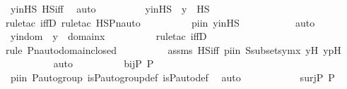 \begin{isabellebody}
\ yinHS\ HS{\isacharunderscore}{\kern0pt}iff\ \isamarkupfalse%
\ auto\isanewline
\ \ \ \ \ \ \isamarkupfalse%
\ \isamarkupfalse%
\ y{\isacharprime}{\kern0pt}inHS\ {\isacharcolon}{\kern0pt}\ {\isachardoublequoteopen}y{\isacharprime}{\kern0pt}\ {\isasymin}\ HS{\isachardoublequoteclose}\ \isanewline
\ \ \ \ \ \ \ \ \isamarkupfalse%
{\isacharparenleft}{\kern0pt}rule{\isacharunderscore}{\kern0pt}tac\ iffD{}{\isacharcomma}{\kern0pt}\ rule{\isacharunderscore}{\kern0pt}tac\ HS{\isacharunderscore}{\kern0pt}Pn{\isacharunderscore}{\kern0pt}auto{\isacharparenright}{\kern0pt}\isanewline
\ \ \ \ \ \ \ \ \isamarkupfalse%
\ piin{\isasymG}\ yinHS\ \isanewline
\ \ \ \ \ \ \ \ \isamarkupfalse%
\ auto\isanewline
\ \ \ \ \ \ \isamarkupfalse%
\ \isamarkupfalse%
\ y{\isacharprime}{\kern0pt}indom\ {\isacharcolon}{\kern0pt}\ {\isachardoublequoteopen}y{\isacharprime}{\kern0pt}\ {\isasymin}\ domain{\isacharparenleft}{\kern0pt}x{\isacharparenright}{\kern0pt}{\isachardoublequoteclose}\ \isanewline
\ \ \ \ \ \ \ \ \isamarkupfalse%
{\isacharparenleft}{\kern0pt}rule{\isacharunderscore}{\kern0pt}tac\ iffD{}{\isacharparenright}{\kern0pt}\isanewline
\ \ \ \ \ \ \ \ \ \isamarkupfalse%
{\isacharparenleft}{\kern0pt}rule\ Pn{\isacharunderscore}{\kern0pt}auto{\isacharunderscore}{\kern0pt}domain{\isacharunderscore}{\kern0pt}closed{\isacharparenright}{\kern0pt}\isanewline
\ \ \ \ \ \ \ \ \isamarkupfalse%
\ assms\ HS{\isacharunderscore}{\kern0pt}iff\ piin\ Ssubsetsymx\ y{\isacharprime}{\kern0pt}H\ ypH\ \isanewline
\ \ \ \ \ \ \ \ \isamarkupfalse%
\ auto\isanewline
\isanewline
\ \ \ \ \ \ \isamarkupfalse%
\ {\isachardoublequoteopen}{\isasympi}\ {\isasymin}\ bij{\isacharparenleft}{\kern0pt}P{\isacharcomma}{\kern0pt}\ P{\isacharparenright}{\kern0pt}{\isachardoublequoteclose}\ \isamarkupfalse%
\ piin{\isasymG}\ {\isasymG}{\isacharunderscore}{\kern0pt}P{\isacharunderscore}{\kern0pt}auto{\isacharunderscore}{\kern0pt}group\ is{\isacharunderscore}{\kern0pt}P{\isacharunderscore}{\kern0pt}auto{\isacharunderscore}{\kern0pt}group{\isacharunderscore}{\kern0pt}def\ is{\isacharunderscore}{\kern0pt}P{\isacharunderscore}{\kern0pt}auto{\isacharunderscore}{\kern0pt}def\ \isamarkupfalse%
\ auto\isanewline
\ \ \ \ \ \ \isamarkupfalse%
\ \isamarkupfalse%
\ {\isachardoublequoteopen}{\isasympi}\ {\isasymin}\ surj{\isacharparenleft}{\kern0pt}P{\isacharcomma}{\kern0pt}\ P{\isacharparenright}{\kern0pt}{\isachardoublequoteclose}\ \isamarkupfalse%

\end{isabellebody}
